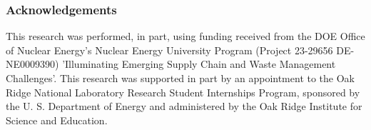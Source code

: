 \begin{frame}
  \frametitle{Acknowledgements}
  This research was performed, in part, using funding received from the DOE
  Office of Nuclear Energy's Nuclear Energy University Program (Project 23-29656
  DE-NE0009390) 'Illuminating Emerging Supply Chain and Waste Management
  Challenges'.
  \vspace{0.5cm}
  This research was supported in part by an appointment to the Oak Ridge
  National Laboratory Research Student Internships Program, sponsored by the U.
  S. Department of Energy and administered by the Oak Ridge Institute for
  Science and Education.
\end{frame}
